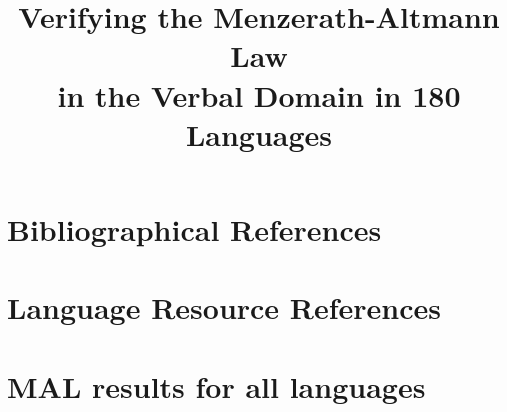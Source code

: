 \documentclass[10pt, a4paper]{article}
\title{Verifying the Menzerath-Altmann Law\\ in the Verbal Domain in 180 Languages}
\begin{document}
\maketitleabstract











\section{Bibliographical References}\label{sec:reference}




\section{Language Resource References}
\label{lr:ref}

\appendix
\onecolumn
\section{MAL results for all languages}\label{app:all-languages}

\end{document}
